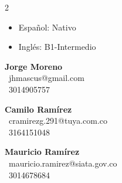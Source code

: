\documentclass[10pt,a4paper,ragged2e,withhyper]{altacv}
\begin{document}
\begin{paracol}{2}

\begin{itemize}
\item Español: Nativo
\item Inglés: B1-Intermedio
\end{itemize}


\begin{cvtags}
\end{cvtags}


\textbf{\textcolor{emphasis}{Jorge Moreno}}\\
\textcolor{accent}{\faEnvelope}\ \textcolor{body}{jhmascus@gmail.com} \\
\textcolor{accent}{\faPhone}\ \textcolor{body}{3014905757}

\medskip

\textbf{\textcolor{emphasis}{Camilo Ramírez}}\\
\textcolor{accent}{\faEnvelope}\ \textcolor{body}{cramirezg.291@tuya.com.co} \\
\textcolor{accent}{\faPhone}\ \textcolor{body}{3164151048}

\medskip

\textbf{\textcolor{emphasis}{Mauricio Ramírez}}\\
\textcolor{accent}{\faEnvelope}\ \textcolor{body}{mauricio.ramirez@siata.gov.co} \\
\textcolor{accent}{\faPhone}\ \textcolor{body}{3014678684}

\end{paracol}
\end{document}
